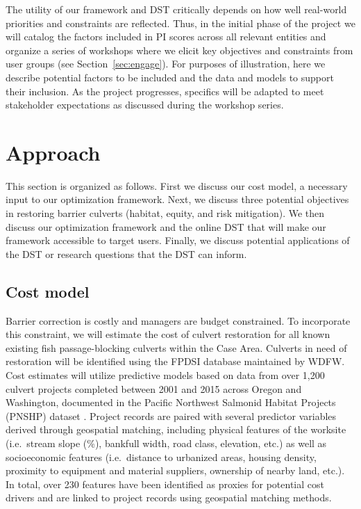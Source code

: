 \documentclass[12pt]{elsarticle}
\begin{document}
The utility of our framework and DST critically depends on how well real-world priorities and constraints are reflected. Thus, in the initial phase of the project we will catalog the factors included in PI scores across all relevant entities and organize a series of workshops where we elicit key objectives and constraints from user groups (see Section~\ref{sec:engage}). For purposes of illustration, here we describe potential factors to be included and the data and models to support their inclusion. As the project progresses, specifics will be adapted to meet stakeholder expectations as discussed during the workshop series.  

%
\section{Approach}


This section is organized as follows. First we discuss our cost model, a necessary input to our optimization framework. Next, we discuss three potential objectives in restoring barrier culverts (habitat, equity, and risk mitigation). We then discuss our optimization framework and the online DST that will make our framework accessible to target users. Finally, we discuss potential applications of the DST or research questions that the DST can inform.

\subsection*{Cost model \label{sec:cost}}



Barrier correction is costly and managers are budget constrained. To incorporate this constraint, we will estimate the cost of culvert restoration for all known existing fish passage-blocking culverts within the Case Area. Culverts in need of restoration will be identified using the FPDSI database maintained by WDFW. Cost estimates will utilize predictive models based on data from over 1,200 culvert projects completed between 2001 and 2015 across Oregon and Washington, documented in the Pacific Northwest Salmonid Habitat Projects (PNSHP) dataset \citep{katz_freshwater_2007, noauthor_pacific_2021}. Project records are paired with several predictor variables derived through geospatial matching, including physical features of the worksite (i.e.\ stream slope (\%), bankfull width, road class, elevation, etc.) as well as socioeconomic features (i.e.\ distance to urbanized areas, housing density, proximity to equipment and material suppliers, ownership of nearby land, etc.). In total, over 230 features have been identified as proxies for potential cost drivers and are linked to project records using geospatial matching methods. 
\end{document}
